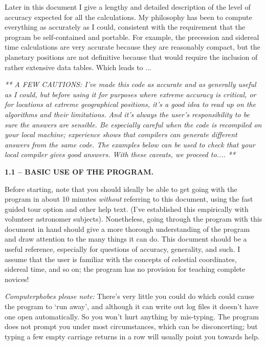 Later in this document I give a lengthy and detailed description 
of the level of
accuracy expected for all the calculations.  My philosophy has been
to compute everything as accurately as I could, consistent with the
requirement that the program be self-contained and portable.  For example,
the precession and sidereal time calculations are very
accurate because they are reasonably compact, but the planetary positions 
are not definitive because that would require the 
inclusion of rather extensive data tables.  Which leads to $\ldots$

\par
{\it	
** A FEW CAUTIONS: I've made this code as accurate and
as generally useful as I could, but
before using it for purposes where extreme accuracy is critical, or for
locations at extreme geographical positions, it's a good
idea to read up on the algorithms and their limitations.  And it's
always the user's responsibility to be sure the answers are sensible.
Be especially careful when the code is recompiled on your local machine;
experience shows that compilers can generate different answers from
the same code.  The examples below can be used to check that
your local compiler gives good answers.
With these caveats, we proceed to.... **
}
\bigskip
\centerline{\bf 1.1 -- BASIC USE OF THE PROGRAM.}
\par
Before starting, note that you should ideally be
able to get going with the program in about 10 minutes
{\it without} referring to this document, using the fast guided
tour option and other help text.  
(I've established this empirically with volunteer astronomer
subjects).  Nonetheless, going through the program with this
document in hand should give a more thorough understanding of the
program and draw attention to the many things it can do.
This document should be a useful reference, especially for
questions of accuracy, generality, and such.
I assume that the user is familiar with
the concepts of celestial coordinates, sidereal time, and 
so on; the program has no provision for teaching complete novices!

{\it Computerphobes please note:} There's very little you could do
which could cause the program to `run away', and although it
can write out log files it doesn't have one open automatically.
So you won't hurt anything by mis-typing.  The program does not prompt you
under most circumstances, which can be disconcerting; but typing a 
few empty carriage returns in a row will
usually point you towards help.

\par

